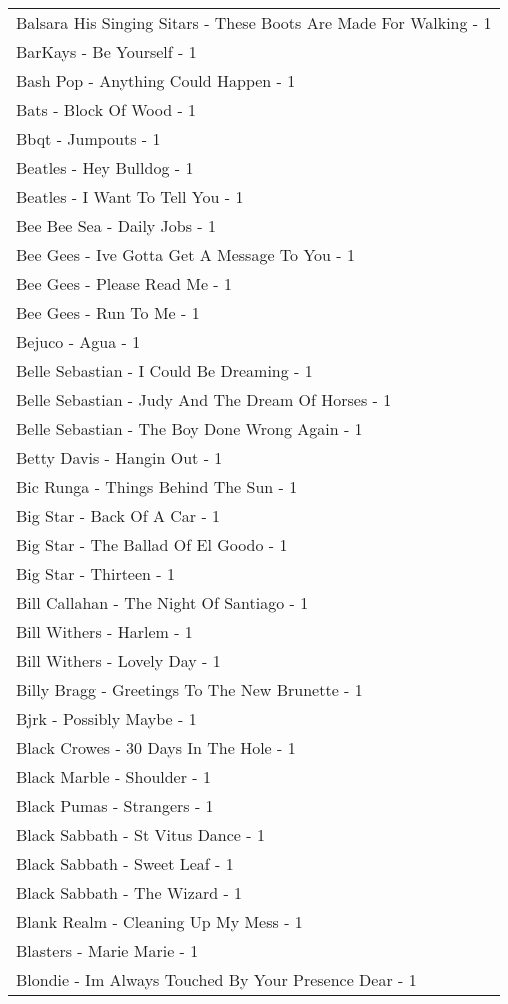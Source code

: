 \documentclass[
]{article}
\begin{document}
\begin{longtable}{l}
Balsara His Singing Sitars - These Boots Are Made For Walking - 1 \\ 
BarKays - Be Yourself - 1 \\ 
Bash Pop - Anything Could Happen - 1 \\ 
Bats - Block Of Wood - 1 \\ 
Bbqt - Jumpouts - 1 \\ 
Beatles - Hey Bulldog - 1 \\ 
Beatles - I Want To Tell You - 1 \\ 
Bee Bee Sea - Daily Jobs - 1 \\ 
Bee Gees - Ive Gotta Get A Message To You - 1 \\ 
Bee Gees - Please Read Me - 1 \\ 
Bee Gees - Run To Me - 1 \\ 
Bejuco - Agua - 1 \\ 
Belle Sebastian - I Could Be Dreaming - 1 \\ 
Belle Sebastian - Judy And The Dream Of Horses - 1 \\ 
Belle Sebastian - The Boy Done Wrong Again - 1 \\ 
Betty Davis - Hangin Out - 1 \\ 
Bic Runga - Things Behind The Sun - 1 \\ 
Big Star - Back Of A Car - 1 \\ 
Big Star - The Ballad Of El Goodo - 1 \\ 
Big Star - Thirteen - 1 \\ 
Bill Callahan - The Night Of Santiago - 1 \\ 
Bill Withers - Harlem - 1 \\ 
Bill Withers - Lovely Day - 1 \\ 
Billy Bragg - Greetings To The New Brunette - 1 \\ 
Bjrk - Possibly Maybe - 1 \\ 
Black Crowes - 30 Days In The Hole - 1 \\ 
Black Marble - Shoulder - 1 \\ 
Black Pumas - Strangers - 1 \\ 
Black Sabbath - St Vitus Dance - 1 \\ 
Black Sabbath - Sweet Leaf - 1 \\ 
Black Sabbath - The Wizard - 1 \\ 
Blank Realm - Cleaning Up My Mess - 1 \\ 
Blasters - Marie Marie - 1 \\ 
Blondie - Im Always Touched By Your Presence Dear - 1 \\ 

\end{longtable}
\end{document}
